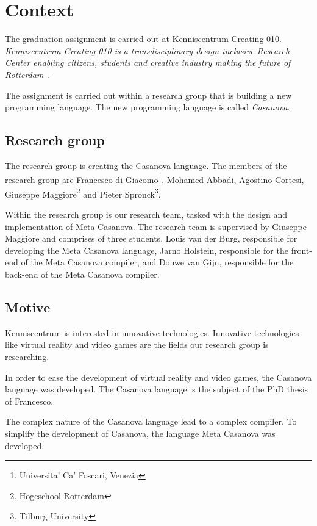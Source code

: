 \section{Context}\label{context}
The graduation assignment is carried out at Kenniscentrum Creating 010.
\textit{Kenniscentrum Creating 010 is a transdisciplinary design-inclusive Research Center enabling citizens, students and creative industry making the future of Rotterdam}~\cite{creating2016home}.

The assignment is carried out within a research group that is building a new programming language.
The new programming language is called \textit{Casanova}.

\subsection{Research group}
The research group is creating the Casanova language.
The members of the research group are 
  Francesco di Giacomo\footnote{\label{venice}Universita' Ca' Foscari, Venezia}, 
  Mohamed Abbadi, 
  Agostino Cortesi, 
  Giuseppe Maggiore\footnote{Hogeschool Rotterdam} and 
  Pieter Spronck\footnote{Tilburg University}.

Within the research group is our research team, tasked with the design and implementation of Meta Casanova.
The research team is supervised by Giuseppe Maggiore and comprises of three students.
Louis van der Burg, responsible for developing the Meta Casanova language,
Jarno Holstein, responsible for the front-end of the Meta Casanova compiler,
and Douwe van Gijn, responsible for the back-end of the Meta Casanova compiler.

\subsection{Motive}\label{motive}
Kenniscentrum is interested in innovative technologies.
Innovative technologies like virtual reality and video games are the fields our research group is researching.

In order to ease the development of virtual reality and video games, the Casanova language was developed.
The Casanova language is the subject of the PhD thesis of Francesco.

The complex nature of the Casanova language lead to a complex compiler.
To simplify the development of Casanova, the language Meta Casanova was developed.

